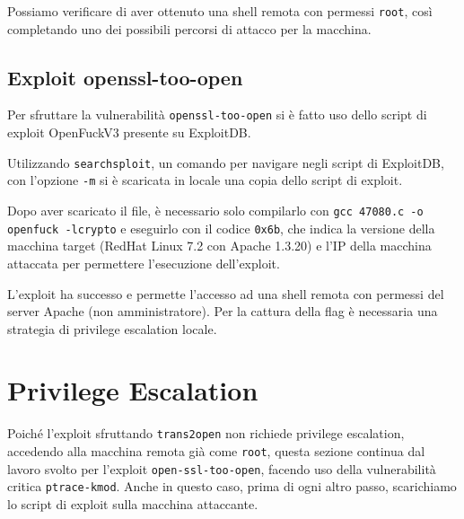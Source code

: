 \documentclass[12pt, a4paper]{article}
\begin{document}
	Possiamo verificare di aver ottenuto una shell remota con permessi \texttt{root}, così completando uno dei possibili percorsi di attacco per la macchina.
	
	\subsection{Exploit openssl-too-open}
	Per sfruttare la vulnerabilità \texttt{openssl-too-open} si è fatto uso dello script di exploit OpenFuckV3\cite{exploit-openfuck} presente su ExploitDB.
	
	Utilizzando \texttt{searchsploit}, un comando per navigare negli script di ExploitDB, con l'opzione \texttt{-m} si è scaricata in locale una copia dello script di exploit.
	
	
	Dopo aver scaricato il file, è necessario solo compilarlo con \texttt{gcc 47080.c -o openfuck -lcrypto} e eseguirlo con il codice \texttt{0x6b}, che indica la versione della macchina target (RedHat Linux 7.2 con Apache 1.3.20) e l'IP della macchina attaccata per permettere l'esecuzione dell'exploit.
	
	
	L'exploit ha successo e permette l'accesso ad una shell remota con permessi del server Apache (non amministratore). Per la cattura della flag è necessaria una strategia di privilege escalation locale.
	
	\section{Privilege Escalation}
	Poiché l'exploit sfruttando \texttt{trans2open} non richiede privilege escalation, accedendo alla macchina remota già come \texttt{root}, questa sezione continua dal lavoro svolto per l'exploit \texttt{open-ssl-too-open}, facendo uso della vulnerabilità critica \texttt{ptrace-kmod}. Anche in questo caso, prima di ogni altro passo, scarichiamo lo script di exploit\cite{exploit-ptrace} sulla macchina attaccante.
	
	
\end{document}
